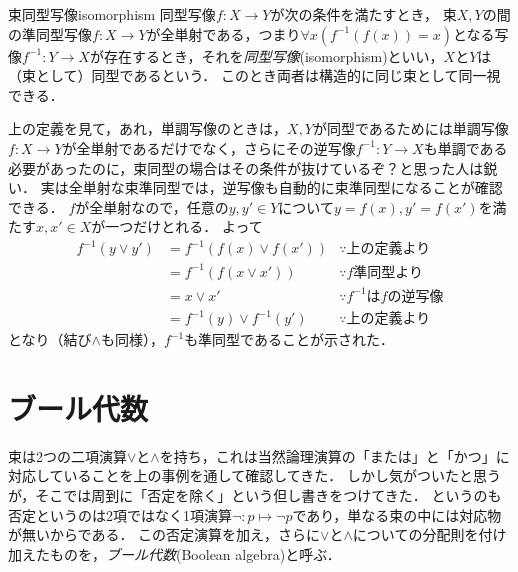 \documentclass[11pt,a4paper, dvipdfmx]{jsarticle}
\begin{document}
\begin{dfn}{束同型写像}{isomorphism}
同型写像$f:X \to Y$が次の条件を満たすとき，
束$X, Y$の間の準同型写像$f:X \to Y$が全単射である，つまり$\forall x (f^{-1}(f(x))=x)$となる写像$f^{-1}:Y \to X$が存在するとき，それを\emph{同型写像}(isomorphism)といい，$X$と$Y$は（束として）同型であるという．
このとき両者は構造的に同じ束として同一視できる．
\end{dfn}

\begin{attn}
上の定義を見て，あれ，単調写像のときは，$X,Y$が同型であるためには単調写像$f: X \to Y$が全単射であるだけでなく，さらにその逆写像$f^{-1}: Y \to X$も単調である必要があったのに，束同型の場合はその条件が抜けているぞ？と思った人は鋭い．
実は全単射な束準同型では，逆写像も自動的に束準同型になることが確認できる．
$f$が全単射なので，任意の$y, y' \in Y$について$y = f(x), y'=f(x')$を満たす$x, x' \in X$が一つだけとれる．
よって
\begin{align*}
    f^{-1}(y \vee y') 
    &= f^{-1}(f(x) \vee f(x')) & \because \text{上の定義より}\\
    &= f^{-1}(f(x \vee x')) & \because f \text{準同型より} \\
    &= x \vee x' & \because f^{-1} \text{は} f \text{の逆写像} \\
    &= f^{-1}(y) \vee f^{-1}(y') & \because \text{上の定義より}
\end{align*}
となり（結び$\wedge$も同様），$f^{-1}$も準同型であることが示された．
\end{attn}




\section{ブール代数}

束は2つの二項演算$\vee$と$\wedge$を持ち，これは当然論理演算の「または」と「かつ」に対応していることを上の事例を通して確認してきた．
しかし気がついたと思うが，そこでは周到に「否定を除く」という但し書きをつけてきた．
というのも否定というのは2項ではなく1項演算$\neg:p \mapsto \neg p$であり，単なる束の中には対応物が無いからである．
この否定演算を加え，さらに$\vee$と$\wedge$についての分配則を付け加えたものを，\emph{ブール代数}(Boolean algebra)と呼ぶ．
\end{document}
